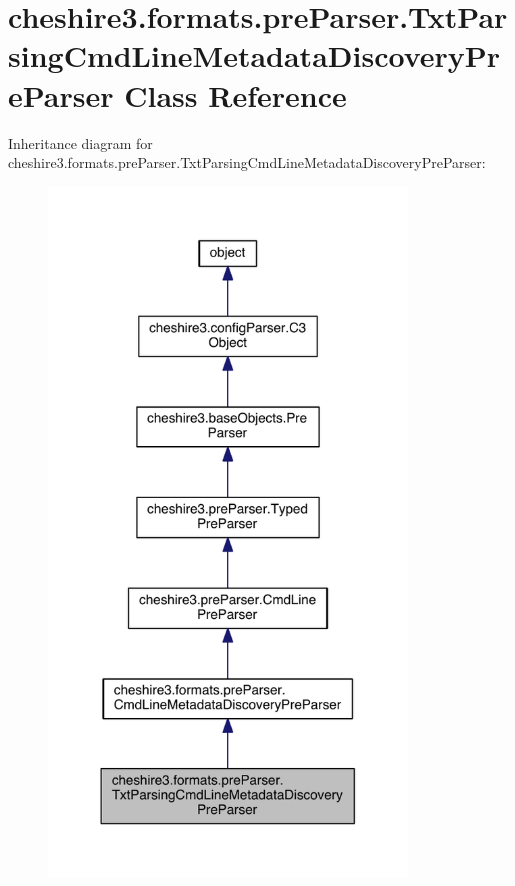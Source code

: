 \hypertarget{classcheshire3_1_1formats_1_1pre_parser_1_1_txt_parsing_cmd_line_metadata_discovery_pre_parser}{\section{cheshire3.\-formats.\-pre\-Parser.\-Txt\-Parsing\-Cmd\-Line\-Metadata\-Discovery\-Pre\-Parser Class Reference}
\label{classcheshire3_1_1formats_1_1pre_parser_1_1_txt_parsing_cmd_line_metadata_discovery_pre_parser}
}


Inheritance diagram for cheshire3.\-formats.\-pre\-Parser.\-Txt\-Parsing\-Cmd\-Line\-Metadata\-Discovery\-Pre\-Parser\-:
\nopagebreak
\begin{figure}[H]
\begin{center}
\leavevmode
\includegraphics[width=270pt]{classcheshire3_1_1formats_1_1pre_parser_1_1_txt_parsing_cmd_line_metadata_discovery_pre_parser__inherit__graph}
\end{center}
\end{figure}


